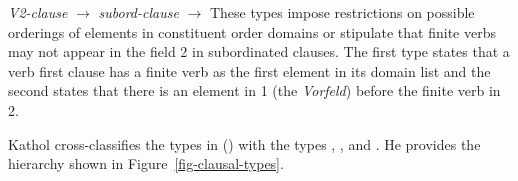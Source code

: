 \ex\label{v2-clause-type} {\it V2-clause\/} $\to$ 
\ex\label{subord-clause-types} {\it subord-clause\/} $\to$ 
\zl
These types impose restrictions on possible orderings of elements in constituent
order domains or stipulate that finite verbs may not appear in the field 2 in subordinated
clauses. The first type states that a verb first clause has a finite verb as the
first element in its domain list and the second states that there is an element in 1 (the \textit{Vorfeld}) 
before the finite verb in 2.

Kathol cross-classifies the types in () with the types , , and
. He provides the hierarchy shown in Figure~\vref{fig-clausal-types}.


